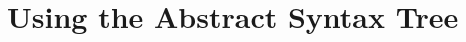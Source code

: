 \documentclass[12pt,letterpaper]{report}
\begin{document}
\chapter{Using the Abstract Syntax Tree}

\end{document}
